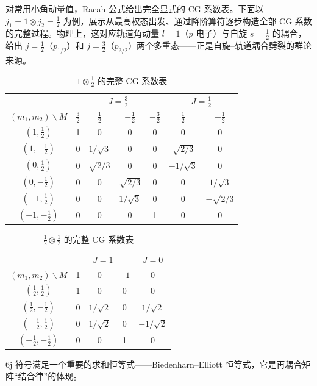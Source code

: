 对常用小角动量值，Racah 公式给出完全显式的 CG 系数表。下面以 $j_1=1\otimes j_2=\frac12$ 为例，展示从最高权态出发、通过降阶算符逐步构造全部 CG 系数的完整过程。物理上，这对应轨道角动量 $l=1$（$p$ 电子）与自旋 $s=\frac12$ 的耦合，给出 $j=\frac12$（$p_{1/2}$）和 $j=\frac32$（$p_{3/2}$）两个多重态——正是自旋--轨道耦合劈裂的群论来源。
\begin{table}[htbp]
\centering
\caption{$1\otimes\tfrac12$ 的完整 CG 系数表}
\label{tab:cg-1-half}
\small
\begin{tabular}{c|cccc|cc}
\toprule
&\multicolumn{4}{c|}{$J=\tfrac32$}&\multicolumn{2}{c}{$J=\tfrac12$}\\
$(m_1,m_2)\backslash M$&$\tfrac32$&$\tfrac12$&$-\tfrac12$&$-\tfrac32$&$\tfrac12$&$-\tfrac12$\\\midrule
$(1,\tfrac12)$&1&0&0&0&0&0\\
$(1,-\tfrac12)$&0&$1/\sqrt3$&0&0&$\sqrt{2/3}$&0\\
$(0,\tfrac12)$&0&$\sqrt{2/3}$&0&0&$-1/\sqrt3$&0\\
$(0,-\tfrac12)$&0&0&$\sqrt{2/3}$&0&0&$1/\sqrt3$\\
$(-1,\tfrac12)$&0&0&$1/\sqrt3$&0&0&$-\sqrt{2/3}$\\
$(-1,-\tfrac12)$&0&0&0&1&0&0\\\bottomrule
\end{tabular}
\end{table}
\par\medskip
\par\medskip
\begin{table}[htbp]
\centering
\caption{$\tfrac12\otimes\tfrac12$ 的完整 CG 系数表}
\label{tab:cg-half-half}
\begin{tabular}{c|ccc|c}
\toprule
&\multicolumn{3}{c|}{$J=1$}&$J=0$\\
$(m_1,m_2)\backslash M$&1&0&$-1$&0\\\midrule
$(\tfrac12,\tfrac12)$&1&0&0&0\\
$(\tfrac12,-\tfrac12)$&0&$1/\sqrt2$&0&$1/\sqrt2$\\
$(-\tfrac12,\tfrac12)$&0&$1/\sqrt2$&0&$-1/\sqrt2$\\
$(-\tfrac12,-\tfrac12)$&0&0&1&0\\\bottomrule
\end{tabular}
\end{table}
6j 符号满足一个重要的求和恒等式——Biedenharn--Elliott 恒等式，它是再耦合矩阵“结合律”的体现。
